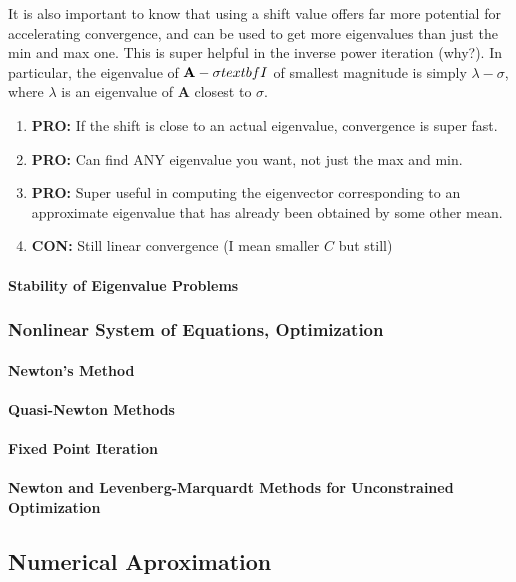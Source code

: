 \documentclass[a4paper,12pt]{article} %
\begin{document}
It is also important to know that using a shift value offers far more potential for accelerating convergence, and can be used to get more eigenvalues than just the min and max one. This is super helpful in the inverse power iteration (why?). In particular, the eigenvalue of $\textbf{A} - \sigma\\textbf{I}$ of smallest magnitude is simply $\lambda - \sigma$, where $\lambda$ is an eigenvalue of $\textbf{A}$ closest to $\sigma$.
\begin{enumerate}
	\item \textbf{PRO:} If the shift is close to an actual eigenvalue, convergence is super fast.
	\item \textbf{PRO:} Can find ANY eigenvalue you want, not just the max and min.
	\item \textbf{PRO:} Super useful in computing the eigenvector corresponding to an approximate eigenvalue that has already been obtained by some other mean. 
	\item \textbf{CON:} Still linear convergence (I mean smaller $C$ but still)
\end{enumerate}
\paragraph{Stability of Eigenvalue Problems}

\subsubsection{Nonlinear System of Equations, Optimization}
\paragraph{Newton's Method}
\paragraph{Quasi-Newton Methods}
\paragraph{Fixed Point Iteration}
\paragraph{Newton and Levenberg-Marquardt Methods for Unconstrained Optimization}

\subsection{Numerical Aproximation}
\end{document}
